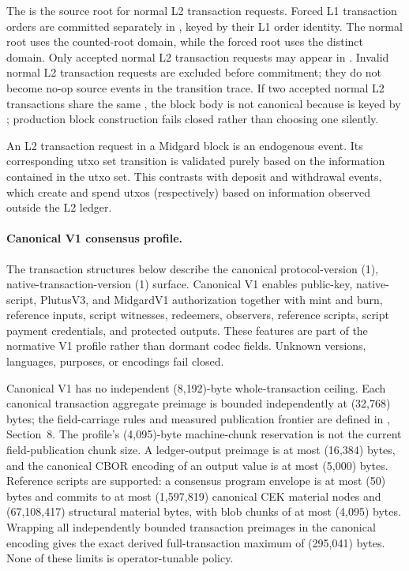 \documentclass[../midgard.tex]{subfiles}
\begin{document}
The  is the source root for normal L2 transaction requests.
Forced L1 transaction orders are committed separately in , keyed by their L1 order identity.
The normal root uses the  counted-root domain,
while the forced root uses the distinct
 domain.
Only accepted normal L2 transaction requests may appear in .
Invalid normal L2 transaction requests are excluded before commitment; they do not become no-op source events in the transition trace.
If two accepted normal L2 transactions share the same , the block body is not canonical because  is keyed by ; production block construction fails closed rather than choosing one silently.

An L2 transaction request in a Midgard block is an endogenous event.
Its corresponding utxo set transition is validated purely based on the information contained in the utxo set.
This contrasts with deposit and withdrawal events, which create and spend utxos (respectively) based on information observed outside the L2 ledger.

\paragraph{Canonical V1 consensus profile.}
The transaction structures below describe the canonical protocol-version (1),
native-transaction-version (1) surface. Canonical V1 enables public-key,
native-script, PlutusV3, and MidgardV1 authorization together with mint and
burn, reference inputs, script witnesses, redeemers, observers, reference
scripts, script payment credentials, and protected outputs. These features are
part of the normative V1 profile rather than dormant codec fields. Unknown
versions, languages, purposes, or encodings fail closed.

Canonical V1 has no independent (8{,}192)-byte whole-transaction ceiling.
Each canonical transaction aggregate preimage is bounded independently at
(32{,}768) bytes; the field-carriage rules and measured publication frontier are defined in , Section~8.
The profile's (4{,}095)-byte machine-chunk reservation is not the current field-publication chunk size. A ledger-output preimage is at most (16{,}384) bytes, and
the canonical CBOR encoding of an output value is at most (5{,}000) bytes.
Reference scripts are supported: a consensus program envelope is at most
(50) bytes and commits to at most (1{,}597{,}819) canonical CEK material
nodes and (67{,}108{,}417) structural material bytes, with blob chunks of at
most (4{,}095) bytes. Wrapping all independently bounded transaction
preimages in the canonical encoding gives the exact derived full-transaction
maximum of (295{,}041) bytes. None of these limits is operator-tunable policy.
\end{document}
